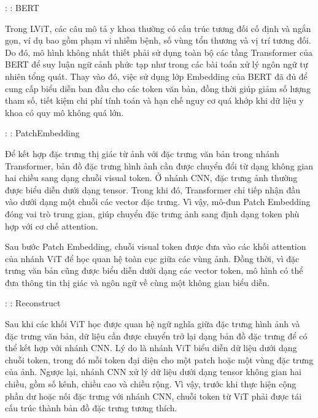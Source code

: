 \begin{frame}{\secname: \subsecname: BERT}

    Trong LViT, các câu mô tả y khoa thường có cấu trúc tương đối cố định và ngắn gọn, ví dụ bao gồm phạm vi nhiễm bệnh, số vùng tổn thương và vị trí tương đối. Do đó, mô hình không nhất thiết phải sử dụng toàn bộ các tầng Transformer của BERT để suy luận ngữ cảnh phức tạp như trong các bài toán xử lý ngôn ngữ tự nhiên tổng quát. Thay vào đó, việc sử dụng lớp Embedding của BERT đã đủ để cung cấp biểu diễn ban đầu cho các token văn bản, đồng thời giúp giảm số lượng tham số, tiết kiệm chi phí tính toán và hạn chế nguy cơ quá khớp khi dữ liệu y khoa có quy mô không quá lớn.

\end{frame}


\begin{frame}{\secname: \subsecname: PatchEmbedding}

    Để kết hợp đặc trưng thị giác từ ảnh với đặc trưng văn bản trong nhánh Transformer, bản đồ đặc trưng hình ảnh cần được chuyển đổi từ dạng không gian hai chiều sang dạng chuỗi visual token. Ở nhánh CNN, đặc trưng ảnh thường được biểu diễn dưới dạng tensor. Trong khi đó, Transformer chỉ tiếp nhận đầu vào dưới dạng một chuỗi các vector đặc trưng. Vì vậy, mô-đun Patch Embedding đóng vai trò trung gian, giúp chuyển đặc trưng ảnh sang định dạng token phù hợp với cơ chế attention.

    \bigskip
    Sau bước Patch Embedding, chuỗi visual token được đưa vào các khối attention của nhánh ViT để học quan hệ toàn cục giữa các vùng ảnh. Đồng thời, vì đặc trưng văn bản cũng được biểu diễn dưới dạng các vector token, mô hình có thể đưa thông tin thị giác và ngôn ngữ về cùng một không gian biểu diễn.

\end{frame}

\begin{frame}{\secname: \subsecname: Reconstruct}

    Sau khi các khối ViT học được quan hệ ngữ nghĩa giữa đặc trưng hình ảnh và đặc trưng văn bản, dữ liệu cần được chuyển trở lại dạng bản đồ đặc trưng để có thể kết hợp với nhánh CNN. Lý do là nhánh ViT biểu diễn dữ liệu dưới dạng chuỗi token, trong đó mỗi token đại diện cho một patch hoặc một vùng đặc trưng của ảnh. Ngược lại, nhánh CNN xử lý dữ liệu dưới dạng tensor không gian hai chiều, gồm số kênh, chiều cao và chiều rộng. Vì vậy, trước khi thực hiện cộng phần dư hoặc nối đặc trưng với nhánh CNN, chuỗi token từ ViT phải được tái cấu trúc thành bản đồ đặc trưng tương thích.

\end{frame}

